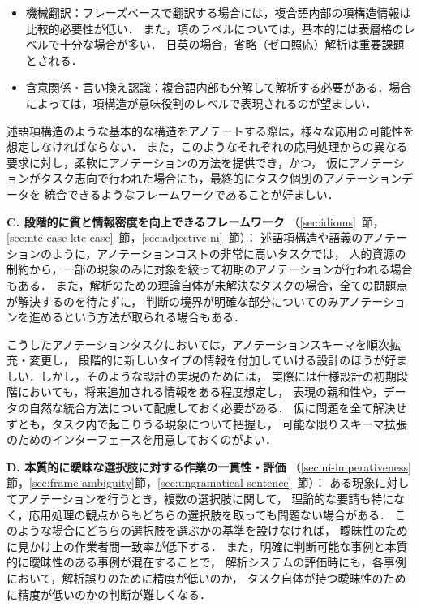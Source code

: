 \documentclass[japanese]{jnlp_1.4}
\begin{document}
\begin{itemize}
\item 機械翻訳：フレーズベースで翻訳する場合には，複合語内部の項構造情報は比較的必要性が低い．
また，項のラベルについては，基本的には表層格のレベルで十分な場合が多い．
日英の場合，省略（ゼロ照応）解析は重要課題とされる．
\item 含意関係・言い換え認識：複合語内部も分解して解析する必要がある．場合によっては，項構造が意味役割のレベルで表現されるのが望ましい．
\end{itemize}

述語項構造のような基本的な構造をアノテートする際は，様々な応用の可能性を想定しなければならない．
また，このようなそれぞれの応用処理からの異なる要求に対し，柔軟にアノテーションの方法を提供でき，かつ，
仮にアノテーションがタスク志向で行われた場合にも，最終的にタスク個別のアノテーションデータを
統合できるようなフレームワークであることが好ましい．


\noindent
\textbf{C. 段階的に質と情報密度を向上できるフレームワーク}
（\ref{sec:idioms}~節，\ref{sec:ntc-case-ktc-case}~節，\ref{sec:adjective-ni}~節）：
述語項構造や語義のアノテーションのように，アノテーションコストの非常に高いタスクでは，
人的資源の制約から，一部の現象のみに対象を絞って初期のアノテーションが行われる場合もある\cite{pradhan2007semeval}．
また，解析のための理論自体が未解決なタスクの場合，全ての問題点が解決するのを待たずに，
判断の境界が明確な部分についてのみアノテーションを進めるという方法が取られる場合もある．

こうしたアノテーションタスクにおいては，アノテーションスキーマを順次拡充・変更し，
段階的に新しいタイプの情報を付加していける設計のほうが好ましい．しかし，そのような設計の実現のためには，
実際には仕様設計の初期段階においても，将来追加される情報をある程度想定し，
表現の親和性や，データの自然な統合方法について配慮しておく必要がある．
仮に問題を全て解決せずとも，タスク内で起こりうる現象について把握し，
可能な限りスキーマ拡張のためのインターフェースを用意しておくのがよい．


\noindent
\textbf{D. 本質的に曖昧な選択肢に対する作業の一貫性・評価}
（\ref{sec:ni-imperativeness}節，\ref{sec:frame-ambiguity}節，\ref{sec:ungramatical-sentence}~節）：
ある現象に対してアノテーションを行うとき，複数の選択肢に関して，
理論的な要請も特になく，応用処理の観点からもどちらの選択肢を取っても問題ない場合がある．
このような場合にどちらの選択肢を選ぶかの基準を設けなければ，
曖昧性のために見かけ上の作業者間一致率が低下する．
また，明確に判断可能な事例と本質的に曖昧性のある事例が混在することで，
解析システムの評価時にも，各事例において，解析誤りのために精度が低いのか，
タスク自体が持つ曖昧性のために精度が低いのかの判断が難しくなる．
\end{document}
